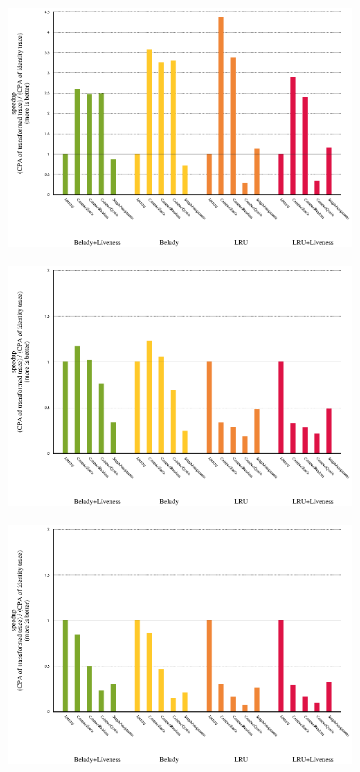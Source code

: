 \documentclass[onecolumn, openright, master, english, signatures]{dbrgrptt}
\begin{document}
\begin{figure}[!ht]
  \centering
  \begin{subfigure}[b]{0.5\textwidth}%
    \includegraphics[width=\textwidth]{figs/plots/speedup-445-gobmk.eps}
  \end{subfigure}%
  \begin{subfigure}[b]{0.5\textwidth}%
    \includegraphics[width=\textwidth]{figs/plots/speedup-450-soplex.eps}
  \end{subfigure}%
  \qquad
  \begin{subfigure}[b]{0.5\textwidth}%
    \includegraphics[width=\textwidth]{figs/plots/speedup-454-calculix.eps}

\end{subfigure}
\end{figure}
\end{document}
